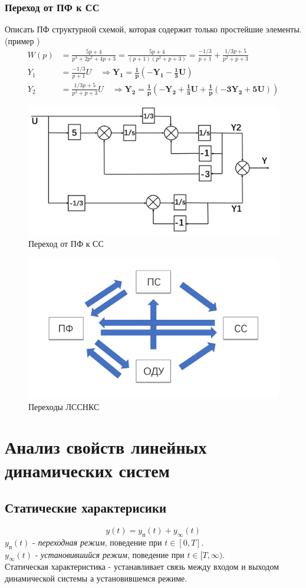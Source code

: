 \documentclass[A4]{article}
\begin{document}
\subsubsection{Переход от ПФ к СС}
Описать ПФ структурной схемой, которая содержит только простейшие элементы. (пример )
\begin{equation}
\begin{aligned}
W(p)&=\frac{5p+4}{p^3+2p^2+4p+3}=\frac{5p+4}{(p+1)(p^2+p+3)}=\frac{-1/3}{p+1}+\frac{1/3p+5}{p^2+p+3}\\
Y_1&=\frac{-1/3}{p+1}U\quad\Rightarrow \bm{Y_1=\frac{1}{p}\left(-Y_1-\frac{1}{3}U\right)}\\
Y_2&=\frac{1/3p+5}{p^2+p+3}U\quad\Rightarrow \bm{Y_2=\frac{1}{p}\left(-Y_2+\frac{1}{3}U+\frac{1}{p}\left(-3Y_2+5U\right)\right)}
\end{aligned}
\end{equation}
\begin{figure}
	\centering
	\includegraphics[width=0.7\linewidth]{10}
	\caption{Переход от ПФ к СС}
	\label{fig:10}
\end{figure}
\begin{figure}
	\centering
	\includegraphics[width=0.7\linewidth]{6}
	\caption{Переходы ЛССНКС}
	\label{fig:6}
\end{figure}
\section{Анализ свойств линейных динамических систем}
\subsection{Статические характерисики}
\begin{equation}
y(t)=y_{\text{п}}(t)+y_{\infty}(t)
\end{equation}
$y_{\text{п}}(t)$ - \emph{переходная режим}, поведение при $t\in[0,T]$.\\
$y_{\infty}(t)$ - \emph{установившийся режим}, поведение при $t\in [T,\infty)$.\\
Статическая характеристика - устанавливает связь между входом и выходом динамической системы а установившемся режиме. 
\end{document}
